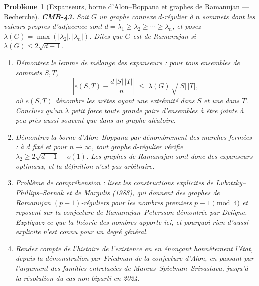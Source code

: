 \documentclass[11pt]{article}
\newtheorem{problem}{Problème}
\begin{document}
\begin{problem}[{Expanseurs, borne d'Alon--Boppana et graphes de Ramanujan --- Recherche}]
\textbf{CMB-43.} Soit $ G $ un graphe connexe $ d $-régulier à $ n $ sommets dont les valeurs propres d'adjacence sont $ d = \lambda_1 \ge \lambda_2 \ge \cdots \ge \lambda_n $, et posez $ \lambda(G) = \max(|\lambda_2|, |\lambda_n|) $. Dites que $ G $ est \textit{de Ramanujan} si $ \lambda(G) \le 2\sqrt{d-1} $.
\begin{enumerate}
\item[(a)] Démontrez le lemme de mélange des expanseurs : pour tous ensembles de sommets $ S, T $,
\[ \left| e(S,T) - \frac{d\,|S|\,|T|}{n} \right| \;\le\; \lambda(G)\, \sqrt{|S|\,|T|}, \]
où $ e(S,T) $ dénombre les arêtes ayant une extrémité dans $ S $ et une dans $ T $. Concluez qu'un $ \lambda $ petit force toute grande paire d'ensembles à être jointe à peu près aussi souvent que dans un graphe aléatoire.
\item[(b)] Démontrez la borne d'Alon--Boppana par dénombrement des marches fermées : à $ d $ fixé et pour $ n \to \infty $, tout graphe $ d $-régulier vérifie $ \lambda_2 \ge 2\sqrt{d-1} - o(1) $. Les graphes de Ramanujan sont donc des expanseurs optimaux, et la définition n'est pas arbitraire.
\item[(c)] Problème de compréhension : lisez les constructions explicites de Lubotzky--Phillips--Sarnak et de Margulis (1988), qui donnent des graphes de Ramanujan $ (p+1) $-réguliers pour les nombres premiers $ p \equiv 1 \pmod 4 $ et reposent sur la conjecture de Ramanujan--Petersson démontrée par Deligne. Expliquez ce que la théorie des nombres apporte ici, et pourquoi rien d'aussi explicite n'est connu pour un degré général.
\item[(d)] Rendez compte de l'histoire de l'existence en en énonçant honnêtement l'état, depuis la démonstration par Friedman de la conjecture d'Alon, en passant par l'argument des familles entrelacées de Marcus--Spielman--Srivastava, jusqu'à la résolution du cas non biparti en 2024.
\end{enumerate}

\end{problem}
\end{document}
